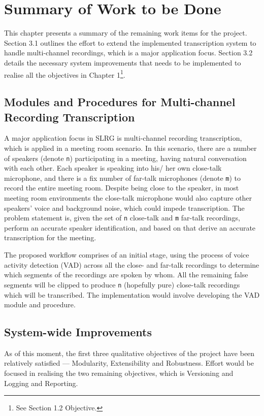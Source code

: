 \chapter{Summary of Work to be Done}

This chapter presents a summary of the remaining work items for the project. Section 3.1 outlines the effort to extend the implemented transcription system to handle multi-channel recordings, which is a major application focus. Section 3.2 details the necessary system improvements that needs to be implemented to realise all the objectives in Chapter 1\footnote{See Section 1.2 Objective.}.

\section{Modules and Procedures for Multi-channel Recording Transcription}

A major application focus in SLRG is multi-channel recording transcription, which is applied in a meeting room scenario. In this scenario, there are a number of speakers (denote \texttt{n}) participating in a meeting, having natural conversation with each other. Each speaker is speaking into his/ her own close-talk microphone, and there is a fix number of far-talk microphones (denote \texttt{m}) to record the entire meeting room. Despite being close to the speaker, in most meeting room environments the close-talk microphone would also capture other speakers' voice and background noise, which could impede transcription. The problem statement is, given the set of \texttt{n} close-talk and \texttt{m} far-talk recordings, perform an accurate speaker identification, and based on that derive an accurate transcription for the meeting.

The proposed workflow comprises of an initial stage, using the process of voice activity detection (VAD) across all the close- and far-talk recordings to determine which segments of the recordings are spoken by whom. All the remaining false segments will be clipped to produce \texttt{n} (hopefully pure) close-talk recordings which will be transcribed. The implementation would involve developing the VAD module and procedure.

\section{System-wide Improvements}

As of this moment, the first three qualitative objectives of the project have been relatively satisfied --- Modularity, Extensibility and Robustness. Effort would be focused in realising the two remaining objectives, which is Versioning and Logging and Reporting.

